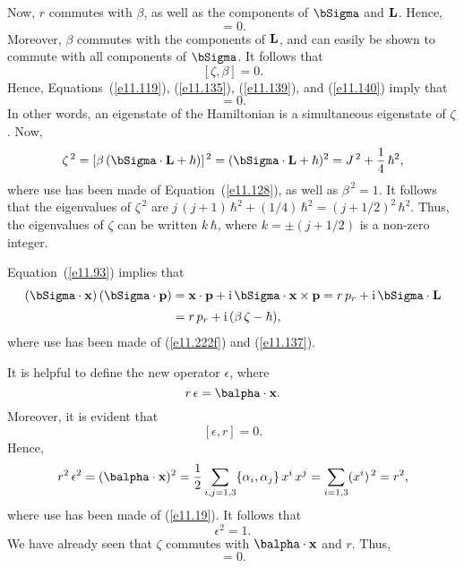 Now, $r$ commutes with $\beta$, as well as the components of $\bSigma$ and ${\bf L}$. Hence,
\begin{equation}
[\zeta,r] = 0.\label{e11.139}
\end{equation}
Moreover, $\beta$ commutes with the components of ${\bf L}$, and can easily be shown to commute with all components of $\bSigma$. 
It follows that
\begin{equation}\label{e11.140}
[\zeta,\beta]=0.
\end{equation}
Hence, Equations~(\ref{e11.119}), (\ref{e11.135}), (\ref{e11.139}), and (\ref{e11.140}) imply that
\begin{equation}
[\zeta, H] =0.
\end{equation}
In other words, an eigenstate of the Hamiltonian is a simultaneous eigenstate of $\zeta$. 
Now,
\begin{equation}
\zeta^{\,2} = [\beta\,(\bSigma\cdot{\bf L}+\hbar)]^{\,2} = (\bSigma\cdot{\bf L}+\hbar)^2 = J^{\,2}+\frac{1}{4}\,\hbar^2,
\end{equation}
where use has been made of Equation~(\ref{e11.128}), as well as $\beta^{\,2}=1$. It follows that the eigenvalues of
$\zeta^{\,2}$ are $j\,(j+1)\,\hbar^2 + (1/4)\,\hbar^2 = (j+1/2)^2\,\hbar^2$. Thus, the eigenvalues of $\zeta$
can be written $k\,\hbar$, where $k=\pm(j+1/2)$ is a non-zero integer. 

Equation~(\ref{e11.93}) implies that 
\begin{align}
(\bSigma\cdot{\bf x})\,(\bSigma\cdot{\bf p}) &= {\bf x}\cdot{\bf p} + {\rm i}\,\bSigma\cdot{\bf x}\times {\bf p} 
= r\,p_r + {\rm i}\,\bSigma\cdot{\bf L}\nonumber\\[0.5ex]
&= r\,p_r + {\rm i}\,(\beta\,\zeta-\hbar),\label{e11.143}
\end{align}
where use has been made of (\ref{e11.222f}) and (\ref{e11.137}).

It is helpful to define the new operator $\epsilon$, where
\begin{equation}\label{e11.144}
r\,\epsilon = \balpha\cdot{\bf x}.
\end{equation}
Moreover, it is evident that
\begin{equation}\label{e11.145}
[\epsilon,r] = 0.
\end{equation}
Hence,
\begin{equation}
r^2\,\epsilon^2 = (\balpha\cdot{\bf x})^2 = \frac{1}{2}\sum_{i,j=1,3}\{\alpha_i,\alpha_j\}\,x^i\,x^j = \sum_{i=1,3}(x^i)^{\,2}=r^2,
\end{equation}
where use has been made of (\ref{e11.19}). 
It follows that
\begin{equation}\label{e11.147}
\epsilon^2 = 1.
\end{equation}
We have already seen that $\zeta$ commutes with $\balpha\cdot{\bf x}$ and $r$. Thus,
\begin{equation}
[\zeta,\epsilon] = 0.
\end{equation}

